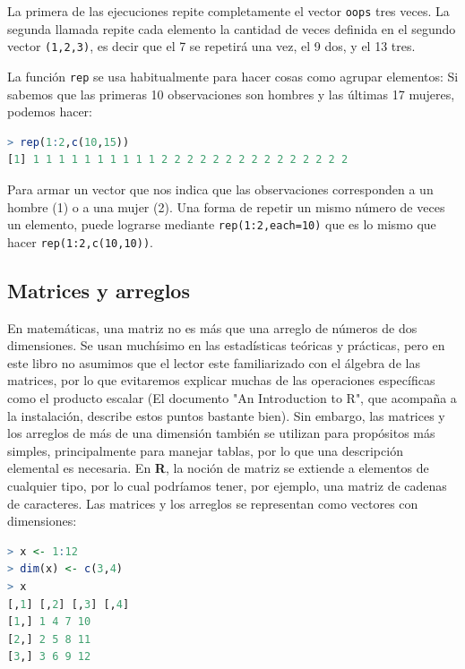\documentclass[spanish]{extbook}
\numberwithin{equation}{section}
\numberwithin{figure}{section}
\begin{document}
La primera de las ejecuciones repite completamente el vector \texttt{oops} tres
veces.  La segunda llamada repite cada elemento la cantidad de veces definida
en el segundo vector \texttt{(1,2,3)}, es decir que el 7 se repetirá una vez,
el 9 dos, y el 13 tres.

La función \texttt{rep} se usa habitualmente para hacer cosas como agrupar elementos: Si
sabemos que las primeras 10 observaciones son hombres y las últimas 17 mujeres,
podemos hacer:

\begin{lstlisting}[language=R]
> rep(1:2,c(10,15))
[1] 1 1 1 1 1 1 1 1 1 1 2 2 2 2 2 2 2 2 2 2 2 2 2 2 2
\end{lstlisting}

Para armar un vector que nos indica que las observaciones corresponden a un
hombre (1) o a una mujer (2).  Una forma de repetir un mismo número de veces un
elemento, puede lograrse mediante \texttt{rep(1:2,each=10)} que es lo mismo que
hacer \texttt{rep(1:2,c(10,10))}.

\subsection{Matrices y arreglos}

En matemáticas, una matriz no es más que una arreglo de números de dos
dimensiones. Se usan muchísimo en las estadísticas teóricas y prácticas, pero
en este libro no asumimos que el lector este familiarizado con el álgebra de
las matrices, por lo que evitaremos explicar muchas de las operaciones
específicas como el producto escalar (El documento "An Introduction to R", que
acompaña a la instalación, describe estos puntos bastante bien). Sin embargo,
las matrices y los arreglos de más de una dimensión también se utilizan para
propósitos más simples, principalmente para manejar tablas, por lo que una
descripción elemental es necesaria. En \textbf{R}, la noción de matriz se
extiende a elementos de cualquier tipo, por lo cual podríamos tener, por
ejemplo, una matriz de cadenas de caracteres. Las matrices y los arreglos se
representan como vectores con dimensiones:


\begin{lstlisting}[language=R]
> x <- 1:12
> dim(x) <- c(3,4)
> x
[,1] [,2] [,3] [,4]
[1,] 1 4 7 10
[2,] 2 5 8 11
[3,] 3 6 9 12
\end{lstlisting}
\end{document}
